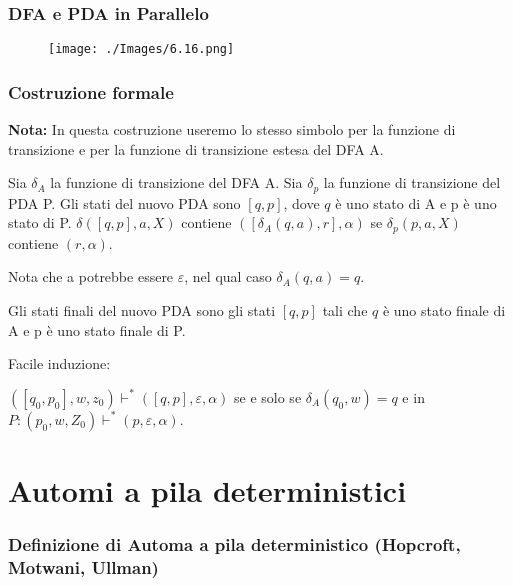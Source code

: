 \subsubsection{DFA e PDA in Parallelo}

\begin{figure}[hbpt!]
    \centering
    \texttt{[image: ./Images/6.16.png]}
\end{figure}
\FloatBarrier

\subsubsection{Costruzione formale}

\textbf{Nota:} In questa costruzione
useremo lo stesso simbolo per la
funzione di transizione e per la funzione
di transizione estesa del DFA A.

\vspace{5mm}

Sia $\delta_{A}$ la funzione di transizione del DFA A. Sia $\delta_{p}$ la funzione di transizione del PDA P. Gli stati del nuovo PDA sono $[q, p]$, dove $q$ è uno stato di A e p è uno stato di P. $\delta([q, p], a, X)$ contiene $\left(\left[\delta_{A}(q, a), r\right], \alpha\right)$ se $\delta_{p}(p, a, X)$ contiene $(r, \alpha)$.


Nota che a potrebbe essere $\varepsilon$, nel qual caso $\delta_{A}(q, a)=q .$

\vspace{5mm}

Gli stati finali del nuovo PDA sono gli stati $[q, p]$ tali che $q$ è uno stato finale di A e p è uno stato finale di P.

\vspace{5mm}

Facile induzione:

$\left(\left[q_{0}, p_{0}\right], w, z_{0}\right)\vdash^{*}([q, p], \varepsilon, \alpha)$
se e solo se
$\delta_{A}\left(q_{0}, w\right)=q$
e in $P:\left(p_{0}, w, Z_{0}\right)\vdash^{*}(p, \varepsilon, \alpha)$.

\section{Automi a pila deterministici}

\subsubsection{Definizione di Automa a pila deterministico (Hopcroft,
Motwani, Ullman)}

